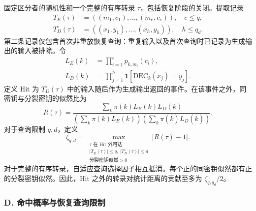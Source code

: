 固定区分者的随机性和一个完整的有序转录 \(\tau\)，包括恢复阶段的关闭。提取记录
\begin{equation}
\begin{aligned}
T_E(\tau) &= ((m_1, c_1), \ldots, (m_e, c_e)), \quad e \le q, \\
T_D^\circ(\tau) &= ((x_1, y_1), \ldots, (x_h, y_h)), \quad h \le q_d.
\end{aligned} \tag{48}
\end{equation}
第二条记录仅包含首次非重放恢复查询：重复输入以及首次查询时已记录为生成输出的输入被排除。令
\begin{equation}
\begin{aligned}
L_E(k) &= \prod_{i=1}^e p_{k,m_i}(c_i), \\
L_D(k) &= \prod_{j=1}^h \mathbf{1}[\mathrm{DEC}_k(x_j) = y_j].
\end{aligned} \tag{49}
\end{equation}
定义 \(\mathrm{Hit}\) 为 \(T_D^\circ(\tau)\) 中的输入随后作为生成输出返回的事件。在该事件之外，同密钥与分裂密钥的似然比为
\begin{equation}
R(\tau) = \frac{\sum_k \pi(k) L_E(k) L_D(k)}{\left( \sum_k \pi(k) L_E(k) \right) \left( \sum_k \pi(\bar{k}) L_D(\bar{k}) \right)}. \tag{50}
\end{equation}
对于查询限制 \(q, d\)，定义
\begin{equation}
\zeta_{q,d} = \max_{\substack{\tau \text{ 在 Hit 外可达} \\ |T_E(\tau)| \le q, \ |T_D^\circ(\tau)| \le d \\ \text{分裂密钥似然} > 0}} |R(\tau) - 1|. \tag{51}
\end{equation}
对于完整的有序转录，自适应查询选择因子相互抵消。每个正的同密钥似然都有正的分裂密钥似然。因此，\(\mathrm{Hit}\) 之外的转录对统计距离的贡献至多为 \(\zeta_{q, q_d} / 2\)。

\subsubsection*{D. 命中概率与恢复查询限制}

